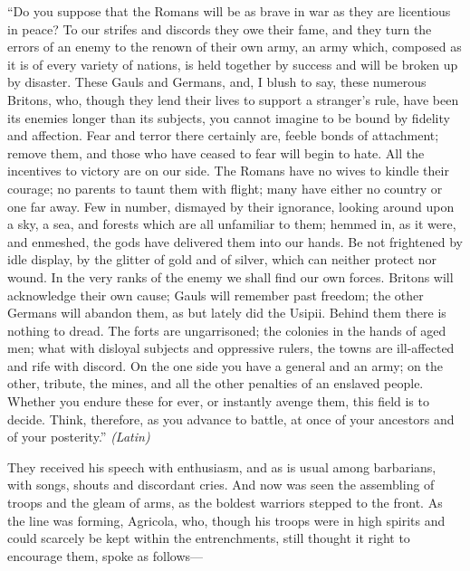 ``Do you suppose that the Romans will be as brave in war as they are licentious in peace? To our strifes and discords they owe their fame, and they turn the errors of an enemy to the renown of their own army, an army which, composed as it is of every variety of nations, is held together by success and will be broken up by disaster. These Gauls and Germans, and, I blush to say, these numerous Britons, who, though they lend their lives to support a stranger's rule, have been its enemies longer than its subjects, you cannot imagine to be bound by fidelity and affection. Fear and terror there certainly are, feeble bonds of attachment; remove them, and those who have ceased to fear will begin to hate. All the incentives to victory are on our side. The Romans have no wives to kindle their courage; no parents to taunt them with flight; many have either no country or one far away. Few in number, dismayed by their ignorance, looking around upon a sky, a sea, and forests which are all unfamiliar to them; hemmed in, as it were, and enmeshed, the gods have delivered them into our hands. Be not frightened by idle display, by the glitter of gold and of silver, which can neither protect nor wound. In the very ranks of the enemy we shall find our own forces. Britons will acknowledge their own cause; Gauls will remember past freedom; the other Germans will abandon them, as but lately did the Usipii. Behind them there is nothing to dread. The forts are ungarrisoned; the colonies in the hands of aged men; what with disloyal subjects and oppressive rulers, the towns are ill-affected and rife with discord. On the one side you have a general and an army; on the other, tribute, the mines, and all the other penalties of an enslaved people. Whether you endure these for ever, or instantly avenge them, this field is to decide. Think, therefore, as you advance to battle, at once of your ancestors and of your posterity.'' \emph{(Latin)}


They received his speech with enthusiasm, and as is usual among barbarians, with songs, shouts and discordant cries. And now was seen the assembling of troops and the gleam of arms, as the boldest warriors stepped to the front. As the line was forming, Agricola, who, though his troops were in high spirits and could scarcely be kept within the entrenchments, still thought it right to encourage them, spoke as follows—

